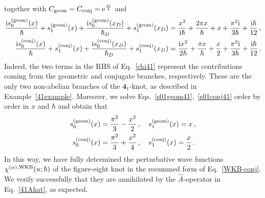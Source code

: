 \documentclass[a4paper,11pt]{article}
\theoremstyle{definition}
\def\FE{\bm{4}_1}
\newcommand{\re}{{\rm e}}
\newcommand{\ri}{{\rm i}}
\begin{document}
together with $C_{\rm{geom}} = C_{\rm{conj}} = \re^{\frac{\pi\ri}{4}}$ and 
\begin{subequations}
\begin{align}
  {\ri s^{(\rm{geom})}_0(x) \over \hbar} + s^{(\rm{geom})}_1(x) + {\ri s^{(\rm{geom})}_0(x_D) \over \hbar_D} + s^{(\rm{geom})}_1(x_D) &= {x^2 \over\ri \hbar} + {2 \pi x \over\hbar} + x + {\pi^2 \ri \over 3 \hbar} + {\ri \hbar \over 12} \, , \label{s01geom41}\\
  {\ri s^{(\rm{conj})}_0(x) \over \hbar} + s^{(\rm{conj})}_1(x) + {\ri s^{(\rm{conj})}_0(x_D) \over \hbar_D} + s^{(\rm{conj})}_1(x_D) &=  {\ri x^2 \over 2 \hbar} + { \pi x \over\hbar} + {x \over 2} + {\pi^2 \ri \over 3 \hbar} + {\ri \hbar \over 12} \, . \label{s01conj41}
\end{align}
\end{subequations}
Indeed, the two terms in the RHS of Eq.~\eqref{chi41} represent the contributions coming from the geometric and conjugate branches, respectively. These are the only two non-abelian branches of the $\FE$-knot, as described in Example~\ref{41example}.
Moreover, we solve Eqs.~\eqref{s01geom41},~\eqref{s01conj41} order by order in $x$ and $\hbar$ and obtain that
\begin{subequations}
\begin{align} 
  s^{(\rm{geom})}_0(x) &= \frac{\pi^2}{3} - \frac{x^2}{2} \, , \quad s^{(\rm{geom})}_1(x) = x \, , \label{s01geom41-new} \\
  s^{(\rm{conj})}_0(x) &= \frac{\pi^2}{3} + \frac{x^2}{4} \, , \quad s^{(\rm{conj})}_1(x) = \frac{x}{2} \, . \label{s01conj41-new}
\end{align}
\end{subequations}
In this way, we have fully determined the perturbative wave functions $\chi^{(\alpha), \rm{WKB}}(u;\hbar)$ of the figure-eight knot in the resummed form of Eq.~\eqref{WKB-conj}. We verify successfully that they are annihilated by the $\hat A$-operator in Eq.~\eqref{41Ahat}, as expected.
\end{document}

